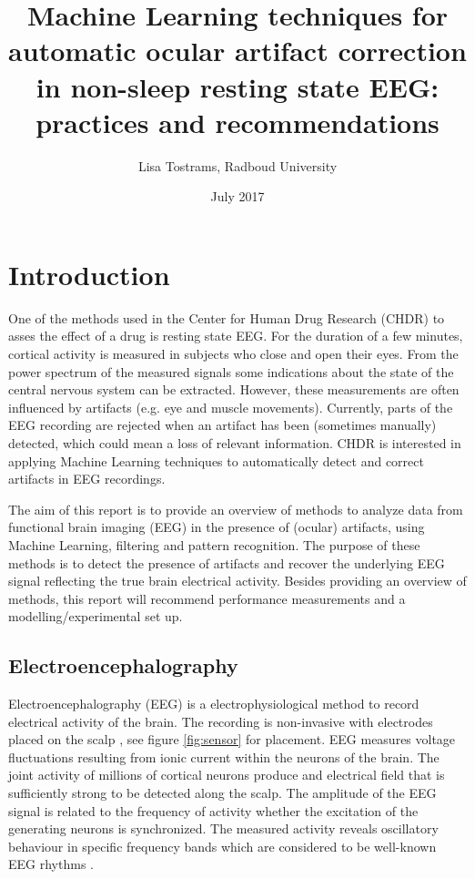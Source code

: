 \documentclass[twoside]{article}
\title{Machine Learning techniques for automatic ocular artifact correction in non-sleep resting state EEG:\\ practices and recommendations}
\author{Lisa Tostrams, Radboud University }
\date{July 2017}
\begin{document}
\maketitle

\tableofcontents

\section{Introduction}
One of the methods used in the Center for Human Drug Research (CHDR) to asses the effect of a drug is resting state EEG. For the duration of a few minutes, cortical activity is measured in subjects who close and open their eyes. From the power spectrum of the measured signals some indications about the state of the central nervous system can be extracted. However, these measurements are often influenced by artifacts (e.g. eye and muscle movements). Currently, parts of the EEG recording are rejected when an artifact has been (sometimes manually) detected, which could mean a loss of relevant information. CHDR is interested in applying Machine Learning techniques to automatically detect and correct artifacts in EEG recordings. 


The aim of this report is to provide an overview of methods to analyze data from functional brain imaging (EEG) in the presence of (ocular) artifacts, using Machine Learning, filtering and pattern recognition. The purpose of these methods is to detect the presence of artifacts and recover the underlying EEG signal reflecting the true brain electrical activity. Besides providing an overview of methods, this report will recommend performance measurements and a modelling/experimental set up. %

\subsection{Electroencephalography}
Electroencephalography (EEG) is a electrophysiological method to record electrical activity of the brain. The recording is non-invasive with electrodes placed on the scalp \cite{eegprinciples}, see figure \ref{fig:sensor} for placement. EEG measures voltage fluctuations resulting from ionic current within the neurons of the brain. The joint activity of millions of cortical neurons produce and electrical field that is sufficiently strong to be detected along the scalp. The amplitude of the EEG signal is related to the frequency of activity whether the excitation of the generating neurons is synchronized. The measured activity reveals oscillatory behaviour in specific frequency bands which are considered to be well-known EEG rhythms \cite{eegpatterns}. 
\end{document}
